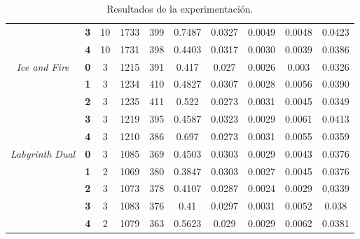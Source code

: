 \begin{landscape}
\begin{table}[]
{\begin{tabular}{|c|c|cccccccc|}
                                         & \textbf{3} & 10 & 1733 & 399 & 0.7487 & 0.0327 & 0.0049 & 0.0048 & 0.0423 \\ \cline{2-10} 
                                         & \textbf{4} & 10 & 1731 & 398 & 0.4403 & 0.0317 & 0.0030 & 0.0039 & 0.0386 \\ \hline
\multirow{5}{*}{\textit{Ice and Fire}}   & \textbf{0} & 3  & 1215 & 391 & 0.417  & 0.027  & 0.0026 & 0.003  & 0.0326 \\ \cline{2-10} 
                                         & \textbf{1} & 3  & 1234 & 410 & 0.4827 & 0.0307 & 0.0028 & 0.0056 & 0.0390 \\ \cline{2-10} 
                                         & \textbf{2} & 3  & 1235 & 411 & 0.522  & 0.0273 & 0.0031 & 0.0045 & 0.0349 \\ \cline{2-10} 
                                         & \textbf{3} & 3  & 1219 & 395 & 0.4587 & 0.0323 & 0.0029 & 0.0061 & 0.0413 \\ \cline{2-10} 
                                         & \textbf{4} & 3  & 1210 & 386 & 0.697  & 0.0273 & 0.0031 & 0.0055 & 0.0359 \\ \hline
\multirow{5}{*}{\textit{Labyrinth Dual}} & \textbf{0} & 3  & 1085 & 369 & 0.4503 & 0.0303 & 0.0029 & 0.0043 & 0.0376 \\ \cline{2-10} 
                                         & \textbf{1} & 2  & 1069 & 380 & 0.3847 & 0.0303 & 0.0027 & 0.0045 & 0.0376 \\ \cline{2-10} 
                                         & \textbf{2} & 3  & 1073 & 378 & 0.4107 & 0.0287 & 0.0024 & 0.0029 & 0,0339 \\ \cline{2-10} 
                                         & \textbf{3} & 3  & 1083 & 376 & 0.41   & 0.0297 & 0.0031 & 0.0052 & 0.038  \\ \cline{2-10} 
                                         & \textbf{4} & 2  & 1079 & 363 & 0.5623 & 0.029  & 0.0029 & 0.0062 & 0.0381 \\ \hline
\end{tabular}%
}
\caption{Resultados de la experimentación.}
\label{tab:exp-results}
\end{table}
\end{landscape}